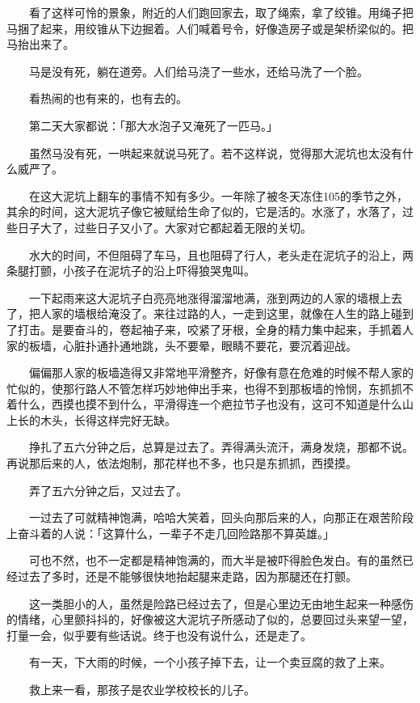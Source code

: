 \documentclass[UTF8]{ctexart}
\begin{document}
　　看了这样可怜的景象，附近的人们跑回家去，取了绳索，拿了绞锥。用绳子把马捆了起来，用绞锥从下边掘着。人们喊着号令，好像造房子或是架桥梁似的。把马抬出来了。

　　马是没有死，躺在道旁。人们给马浇了一些水，还给马洗了一个脸。

　　看热闹的也有来的，也有去的。

　　第二天大家都说：「那大水泡子又淹死了一匹马。」

　　虽然马没有死，一哄起来就说马死了。若不这样说，觉得那大泥坑也太没有什么威严了。

　　在这大泥坑上翻车的事情不知有多少。一年除了被冬天冻住105的季节之外，其余的时间，这大泥坑子像它被赋给生命了似的，它是活的。水涨了，水落了，过些日子大了，过些日子又小了。大家对它都起着无限的关切。

　　水大的时间，不但阻碍了车马，且也阻碍了行人，老头走在泥坑子的沿上，两条腿打颤，小孩子在泥坑子的沿上吓得狼哭鬼叫。

　　一下起雨来这大泥坑子白亮亮地涨得溜溜地满，涨到两边的人家的墙根上去了，把人家的墙根给淹没了。来往过路的人，一走到这里，就像在人生的路上碰到了打击。是要奋斗的，卷起袖子来，咬紧了牙根，全身的精力集中起来，手抓着人家的板墙，心脏扑通扑通地跳，头不要晕，眼睛不要花，要沉着迎战。

　　偏偏那人家的板墙造得又非常地平滑整齐，好像有意在危难的时候不帮人家的忙似的，使那行路人不管怎样巧妙地伸出手来，也得不到那板墙的怜悯，东抓抓不着什么，西摸也摸不到什么，平滑得连一个疤拉节子也没有，这可不知道是什么山上长的木头，长得这样完好无缺。

　　挣扎了五六分钟之后，总算是过去了。弄得满头流汗，满身发烧，那都不说。再说那后来的人，依法炮制，那花样也不多，也只是东抓抓，西摸摸。

　　弄了五六分钟之后，又过去了。

　　一过去了可就精神饱满，哈哈大笑着，回头向那后来的人，向那正在艰苦阶段上奋斗着的人说：「这算什么，一辈子不走几回险路那不算英雄。」

　　可也不然，也不一定都是精神饱满的，而大半是被吓得脸色发白。有的虽然已经过去了多时，还是不能够很快地抬起腿来走路，因为那腿还在打颤。

　　这一类胆小的人，虽然是险路已经过去了，但是心里边无由地生起来一种感伤的情绪，心里颤抖抖的，好像被这大泥坑子所感动了似的，总要回过头来望一望，打量一会，似乎要有些话说。终于也没有说什么，还是走了。

　　有一天，下大雨的时候，一个小孩子掉下去，让一个卖豆腐的救了上来。

　　救上来一看，那孩子是农业学校校长的儿子。
\end{document}
